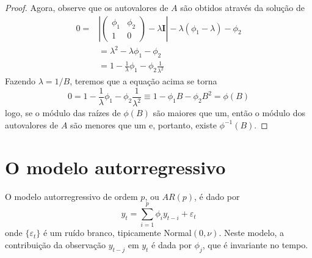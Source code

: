 \documentclass[
  letterpaper,
  DIV=11,
  numbers=noendperiod]{scrreprt}
\theoremstyle{definition}
\theoremstyle{plain}
\theoremstyle{definition}
\theoremstyle{plain}
\theoremstyle{remark}
\begin{document}
\begin{proof}
Agora, observe que os autovalores de \(A\) são obtidos através da
solução de\\
\[\begin{align}0=&\left|\left(\begin{array}{cc}\phi_1 & \phi_2 \\ 1 & 0\end{array}\right)-\lambda \textbf{I}\right|-\lambda(\phi_1-\lambda)-\phi_2\\&=\lambda^2-\lambda \phi_1-\phi_2\\
&=1-\frac{1}{\lambda}\phi_1-\phi_2\frac{1}{\lambda^2}\end{align}\]
Fazendo \(\lambda = 1/B\), teremos que a equação acima se torna
\[0=1-\frac{1}{\lambda}\phi_1-\phi_2\frac{1}{\lambda^2}\equiv 1-\phi_1 B-\phi_2B^2=\phi(B)\]
logo, se o módulo das raízes de \(\phi(B)\) são maiores que um, então o
módulo dos autovalores de \(A\) são menores que um e, portanto, existe
\(\phi^{-1}(B)\).

\end{proof}

\hypertarget{o-modelo-autorregressivo}{%
\section{O modelo autorregressivo}\label{o-modelo-autorregressivo}}

O modelo autorregressivo de ordem \(p\), ou \(AR(p)\), é dado por
\[\begin{equation}
        y_t = \sum_{i=1}^{p}\phi_iy_{t-i} +\varepsilon_t
\end{equation}\] onde \(\{\varepsilon_t\}\) é um ruído branco,
tipicamente Normal\((0,\nu)\). Neste modelo, a contribuição da
observação \(y_{t-j}\) em \(y_t\) é dada por \(\phi_j\), que é
invariante no tempo.
\end{document}
